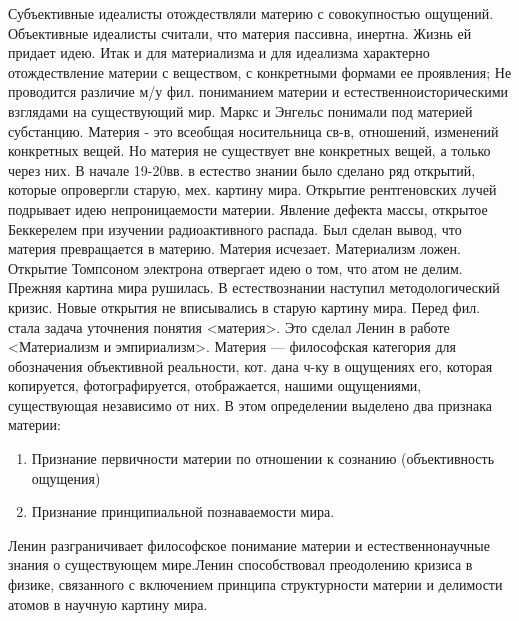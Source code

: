 \documentclass[12pt]{article}
\begin{document}
Субъективные  идеалисты
отождествляли материю с совокупностью ощущений. Объективные идеалисты считали, что материя пассивна,
инертна. Жизнь ей придает идею. Итак и для материализма  и для идеализма характерно отождествление
материи с веществом, с конкретными формами ее проявления; Не проводится различие м/у фил. пониманием
материи  и  естественноисторическими   взглядами  на  существующий  мир.  Маркс  и  Энгельс  понимали  под
материей субстанцию.
  Материя  -  это  всеобщая  носительница  св-в,  отношений,  изменений  конкретных  вещей.   Но  материя  не
существует вне конкретных вещей, а только через них. В начале 19-20вв. в естество знании было сделано ряд
открытий, которые опровергли старую, мех. картину мира. Открытие рентгеновских лучей подрывает идею
непроницаемости  материи.  Явление   дефекта  массы,   открытое  Беккерелем  при  изучении  радиоактивного
распада. Был сделан  вывод, что материя превращается в материю. Материя исчезает. Материализм ложен.
Открытие Томпсоном электрона отвергает идею о том, что атом не делим. Прежняя картина мира рушилась. В
естествознании наступил методологический кризис. Новые открытия не вписывались в старую картину мира.
Перед фил. стала задача уточнения понятия <материя>.
  Это  сделал  Ленин  в  работе  <Материализм  и  эмпириализм>.   Материя --- философская  категория   для
обозначения объективной реальности, кот. дана ч-ку в ощущениях его, которая копируется, фотографируется,
отображается, нашими ощущениями,  существующая независимо  от  них.   В  этом  определении выделено два
признака материи:
\begin{enumerate}
  \item Признание первичности материи по отношении к сознанию (объективность ощущения) 
  \item Признание принципиальной познаваемости мира.
\end{enumerate}    
    Ленин разграничивает философское понимание материи и
естественнонаучные  знания   о  существующем  мире.Ленин  способствовал  преодолению  кризиса  в  физике,
связанного с включением принципа структурности материи и делимости атомов в научную картину мира.

\newpage
\end{document}

